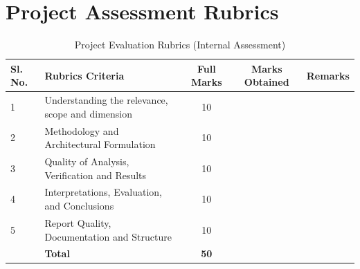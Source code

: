 \documentclass[12pt,a4paper]{article}
\begin{document}
\section{Project Assessment Rubrics}
\begin{table}[H]
    \centering
    \caption{Project Evaluation Rubrics (Internal Assessment)}
    \begin{tabular}{llccc}
        \toprule
        \textbf{Sl. No.} & \textbf{Rubrics Criteria} & \textbf{Full Marks} & \textbf{Marks Obtained} & \textbf{Remarks} \\
        \midrule
        1 & Understanding the relevance, scope and dimension & 10 & & \\
        2 & Methodology and Architectural Formulation & 10 & & \\
        3 & Quality of Analysis, Verification and Results & 10 & & \\
        4 & Interpretations, Evaluation, and Conclusions & 10 & & \\
        5 & Report Quality, Documentation and Structure & 10 & & \\
        \midrule
        & \textbf{Total} & \textbf{50} & & \\
        \bottomrule
    \end{tabular}
\end{table}
\end{document}
